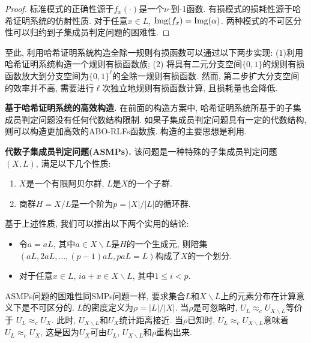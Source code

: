 \begin{proof}
标准模式的正确性源于$f_x(\cdot)$是一个$\nu$-到-1函数. 
有损模式的损耗性源于哈希证明系统的仿射性质. 对于任意$x \in L$, $\textup{Img}(f_x) = \textup{Img}(\alpha)$. 两种模式的不可区分性可以归约到子集成员判定问题的困难性. 
\end{proof}

至此, 利用哈希证明系统构造全除一规则有损函数可以通过以下两步实现: (1)利用哈希证明系统构造一个规则有损函数族; (2) 将具有二元分支空间$\{0, 1\}$的规则有损函数放大到分支空间为$\{0,1\}^\ell$的全除一规则有损函数. 然而, 第二步扩大分支空间的效率并不高, 需要进行$\ell$次独立地规则有损函数计算, 且损耗量也会降低.  

\medskip\noindent\textbf{基于哈希证明系统的高效构造.} 在前面的构造方案中, 哈希证明系统所基于的子集成员判定问题没有任何代数结构限制. 如果子集成员判定问题具有一定的代数结构, 则可以构造更加高效的ABO-RLFs函数族. 构造的主要思想是利用. 
 
\begin{trivlist}
\item \textbf{代数子集成员判定问题(ASMPs).} 该问题是一种特殊的子集成员判定问题$(X, L)$, 满足以下几个性质: 
\begin{enumerate}\itemsep 1pt \parskip 0pt \parsep 0pt
	\item $X$是一个有限阿贝尔群, $L$是$X$的一个子群. 
	\item 商群$H = X/L$是一个阶为$p = |X|/|L|$的循环群. 
\end{enumerate}
基于上述性质, 我们可以推出以下两个实用的结论: 
\begin{itemize}\itemsep 1pt \parskip 0pt \parsep 0pt
	\item 令$\overline{a} = aL$, 其中$a \in X \backslash L$是$H$的一个生成元, 
		则陪集$(aL, 2aL, \dots, (p-1)aL, paL = L)$构成了$X$的一个划分. 

	\item 对于任意$x \in L$, $ia + x \in X \backslash L$, 其中$1 \leq i < p$. 
\end{itemize}     

ASMPs问题的困难性同SMPs问题一样, 要求集合$L$和$X \backslash L$上的元素分布在计算意义下是不可区分的. $L$的密度定义为$\rho = |L|/|X|$. 当$\rho$是可忽略时, $U_L \approx_c U_{X \backslash L}$等价于 
$U_L \approx_c U_{X}$. 此时, $U_{X \backslash L}$和$U_X$统计距离接近. 
当$\rho$已知时, $U_L \approx_c U_{X \backslash L}$意味着$U_L \approx_c U_X$, 这是因为$U_X$可由$U_L$, $U_{X \backslash L}$和$\rho$重构出来.
\end{trivlist} 

